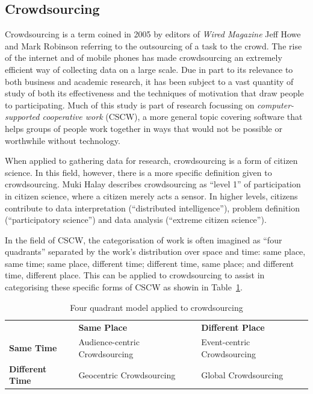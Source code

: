 \documentclass{article}
\begin{document}
		\subsection{Crowdsourcing}
		Crowdsourcing is a term coined in 2005 by editors of \emph{Wired Magazine} Jeff Howe and Mark Robinson\cite{safire_fat_2009} referring to the outsourcing of a task to the crowd. The rise of the internet and of mobile phones has made crowdsourcing an extremely efficient way of collecting data on a large scale. Due in part to its relevance to both business and academic research, it has been subject to a vast quantity of study of both its effectiveness\cite{brabham_effectiveness_2010} and the techniques of motivation that draw people to participating\cite{hossain_users_2012}. Much of this study is part of research focussing on \emph{computer-supported cooperative work} (CSCW), a more general topic covering software that helps groups of people work together in ways that would not be possible or worthwhile without technology.

		When applied to gathering data for research, crowdsourcing is a form of citizen science\cite{_citizen_2015}. In this field, however, there is a more specific definition given to crowdsourcing. Muki Halay describes crowdsourcing as ``level 1'' of participation in citizen science, where a citizen merely acts a sensor. In higher levels, citizens contribute to data interpretation (``distributed intelligence''), problem definition (``participatory science'') and data analysis (``extreme citizen science'')\cite{haklay_citizen_2013}.

		In the field of CSCW, the categorisation of work is often imagined as ``four quadrants''\cite{johansen_groupware:_1988} separated by the work's distribution over space and time: same place, same time; same place, different time; different time, same place; and different time, different place. This can be applied to crowdsourcing to assist in categorising these specific forms of CSCW as showin in Table~\ref{tab:quad}\cite{erickson_geocentric_2010}.

		\begin{table}[ht]
			\begin{tabular}{ | l || l | l | }
				\hline
				                        & \textbf{Same Place}            & \textbf{Different Place} \\ \hhline{|=#=|=|}
				\textbf{Same Time}      & Audience-centric Crowdsourcing & Event-centric Crowdsourcing \\ \hline
				\textbf{Different Time} & Geocentric Crowdsourcing       & Global Crowdsourcing \\ \hline
			\end{tabular}
			\caption{Four quadrant model applied to crowdsourcing\cite{erickson_geocentric_2010}}
			\label{tab:quad}
		\end{table}
\end{document}
